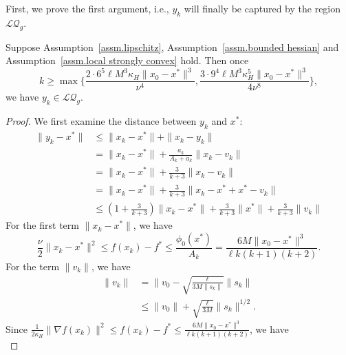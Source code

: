 \documentclass{mcom-l}
\numberwithin{equation}{section}
\begin{document}
First, we prove the first argument, i.e., $y_k$ will finally be captured by the region $\mathcal{LQ}_g$.
\begin{lemma}
    Suppose Assumption~\ref{assm.lipschitz}, Assumption~\ref{assm.bounded hessian} and Assumption~\ref{assm.local strongly convex} hold. Then once
    \begin{equation*}
        k\geq \max\{\frac{2\cdot6^5\ell M^3\kappa_H\|x_0-x^*\|^3}{\nu^4},\frac{3\cdot9^4\ell M^3\kappa_H^5\|x_0-x^*\|^3}{4\nu^8}\},
    \end{equation*}
    we have $y_k\in \mathcal{LQ}_g$.
\end{lemma}
\begin{proof}
    We first examine the distance between $y_k$ and $x^*$:
    \begin{equation*}
        \begin{aligned}
            \|y_k-x^*\| & \leq \|x_k-x^*\|+\|x_k-y_k\|                                                \\
                        & =\|x_k-x^*\|+\frac{a_k}{A_k+a_k}\|x_k-v_k\|                                 \\
                        & = \|x_k-x^*\|+\frac{3}{k+3}\|x_k-v_k\|                                      \\
                        & =\|x_k-x^*\|+\frac{3}{k+3}\|x_k-x^*+x^*-v_k\|                               \\
                        & \leq (1+\frac{3}{k+3})\|x_k-x^*\|+\frac{3}{k+3}\|x^*\|+\frac{3}{k+3}\|v_k\|
        \end{aligned}
    \end{equation*}
    For the first term $\|x_k-x^*\|$, we have
    \begin{equation*}
        \frac{\nu}{2}\|x_k-x^*\|^2 \leq f(x_k)-f^* \leq \frac{\phi_0(x^*)}{A_k}=\frac{6M\|x_0-x^*\|^3}{\ell k(k+1)(k+2)}.
    \end{equation*}
    For the term $\|v_k\|$, we have
    \begin{equation*}
        \begin{aligned}
            \|v_k\| & =\|v_0-\sqrt{\frac{\ell}{3M\|s_{k}\|}}\|s_k\|     \\
                    & \leq \|v_0\|+\sqrt{\frac{\ell}{3M}}\|s_k\|^{1/2}.
        \end{aligned}
    \end{equation*}
    Since $\frac{1}{2\kappa_H}\|\nabla f(x_k)\|^2 \leq f(x_k)-f^* \leq \frac{6M\|x_0-x^*\|^3}{\ell k(k+1)(k+2)}$, we have
    \begin{equation*}

\end{equation*}
\end{proof}
\end{document}
